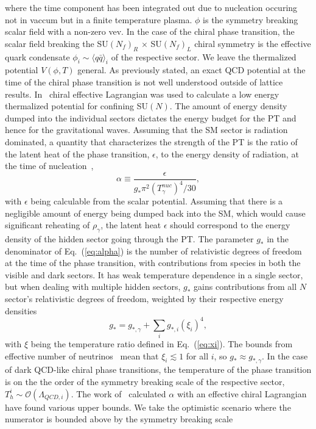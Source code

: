 \documentclass[nofootinbib,twocolumn,preprintnumbers]{revtex4-1}
\begin{document}
where the time component has been integrated out due to nucleation occuring not in vaccum but in a finite temperature plasma. $\phi$ is the symmetry breaking scalar field with a non-zero vev. In the case of the chiral phase transition, the scalar field breaking the SU$(N_f)_{R}$ $ \times$ SU$(N_f)_{L}$ chiral symmetry is the effective quark condensate $\phi_{i} \sim \langle q\bar{q} \rangle_{i}$ of the respective sector. We leave the thermalized potential $V(\phi, T)$ general. As previously stated, an exact QCD potential at the time of the chiral phase transition is not well understood outside of lattice results. In~\cite{Bai:2018dxf} chiral effective Lagrangian was used to calculate a low energy thermalized potential for confining SU$(N)$. 
The amount of energy density dumped into the individual sectors dictates the energy budget for the PT and hence for the gravitational waves. Assuming that the SM sector is radiation dominated, a quantity that characterizes the strength of the PT is the ratio of the latent heat of the phase transition, $\epsilon$, to the energy density of radiation, at the time of nucleation~\citep{Espinosa:2010hh},
\begin{equation}
\alpha     \equiv  \frac{\epsilon}{g_{*} \pi^2 (T^{nuc}_{\gamma})^4/30},
\label{eq:alpha}
\end{equation}
with $\epsilon$ being calculable from the scalar potential. Assuming that there is a negligible amount of energy being dumped back into the SM, which would cause significant reheating of $\rho_{\gamma}$,  the latent heat $\epsilon$ should correspond to the energy density of the hidden sector going through the PT. The parameter $g_{*}$ in the denominator of Eq.~(\ref{eq:alpha}) is the number of relativistic degrees of freedom at the time of the phase transition, with contributions from species in both the visible and dark sectors. It has weak temperature dependence in a single sector, but when dealing with multiple hidden sectors, $g_{*}$ gains contributions from all $N$ sector's relativistic degrees of freedom, weighted by their respective energy densities
\begin{equation}\label{eqn:RelaDOF}
g_{*} = g_{*,\gamma} + \sum_{i} g_{*,i} (\xi_{i})^4,
\end{equation}
with $\xi$ being the temperature ratio defined in Eq.~(\ref{eq:xi}). The bounds from effective number of neutrinos~\citep{Aghanim:2018eyx} mean that $\xi_i \lesssim 1$ for all $i$, so $g_{*} \approx g_{*,\gamma}$. In the case of dark QCD-like chiral  phase transitions, the temperature of the phase transition is on the the order of the symmetry breaking scale of the respective sector, $T_{h}^{i} \sim \mathcal{O}(\Lambda_{QCD,i})$. The work of~\citep{Bai:2018dxf} calculated $\alpha$ with an effective chiral Lagrangian have found various upper bounds. We take the optimistic scenario where the numerator is bounded above by the symmetry breaking scale
\end{document}
